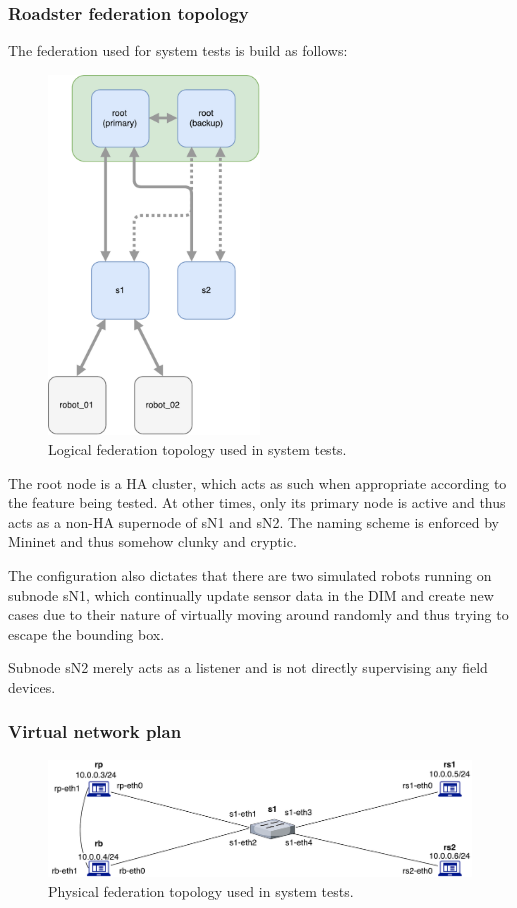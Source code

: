 \subsubsection{Roadster federation topology}
The federation used for system tests is build as follows:
\begin{figure}[]
	\center
	\includegraphics[width=0.5\textwidth]{img/logical_federation_setup.pdf}
	\caption{Logical federation topology used in system tests.}
	\label{lst:testing:topo:logic}
\end{figure}

The root node is a HA cluster, which acts as such when appropriate according to
the feature being tested. At other times, only its primary node is active and
thus acts as a non-HA supernode of sN1 and sN2. The naming scheme is enforced
by Mininet and thus somehow clunky and cryptic.

The configuration also dictates that there are two simulated robots running on
subnode sN1, which continually update sensor data in the DIM and create new
cases due to their nature of virtually moving around randomly and thus trying
to escape the bounding box.

Subnode sN2 merely acts as a listener and is not directly supervising any field
devices.

\subsubsection{Virtual network plan}
\begin{figure}[]
	\center
	\includegraphics[width=\textwidth]{img/physical_network_mininet.pdf}
	\caption{Physical federation topology used in system tests.}
	\label{lst:testing:topo:logic}
\end{figure}

